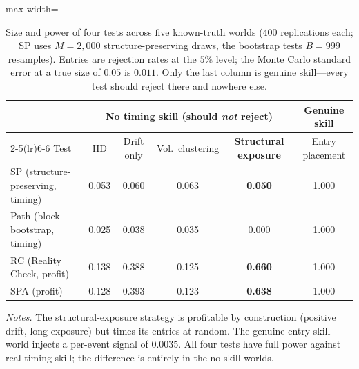 \documentclass[preprint,12pt]{elsarticle}
\theoremstyle{definition}
\begin{document}
\begin{table}[H]
\centering
\caption{Size and power of four tests across five known-truth worlds ($400$ replications each; SP uses $M=2{,}000$ structure-preserving draws, the bootstrap tests $B=999$ resamples). Entries are rejection rates at the $5\%$ level; the Monte Carlo standard error at a true size of $0.05$ is $0.011$. Only the last column is genuine skill---every test should reject there and nowhere else.}
\label{tab:competitor}
{\small
\renewcommand{\arraystretch}{1.15}
\begin{adjustbox}{max width=\textwidth}
\begin{tabular}{@{}lccccc@{}}
\toprule
& \multicolumn{4}{c}{No timing skill (should \emph{not} reject)} & Genuine skill \\
\cmidrule(lr){2-5}\cmidrule(lr){6-6}
Test & IID & Drift only & Vol.\ clustering & \textbf{Structural exposure} & Entry placement \\
\midrule
SP (structure-preserving, timing) & 0.053 & 0.060 & 0.063 & \textbf{0.050} & 1.000 \\
Path (block bootstrap, timing)    & 0.025 & 0.038 & 0.035 & 0.000 & 1.000 \\
RC (Reality Check, profit)        & 0.138 & 0.388 & 0.125 & \textbf{0.660} & 1.000 \\
SPA (profit)                      & 0.128 & 0.393 & 0.123 & \textbf{0.638} & 1.000 \\
\bottomrule
\end{tabular}
\end{adjustbox}
}
\par\vspace{0.5em}
\begin{minipage}{0.95\textwidth}
\centering
\footnotesize\emph{Notes.} The structural-exposure strategy is profitable by construction (positive drift, long exposure) but times its entries at random. The genuine entry-skill world injects a per-event signal of $0.0035$. All four tests have full power against real timing skill; the difference is entirely in the no-skill worlds.
\end{minipage}
\end{table}
\end{document}
